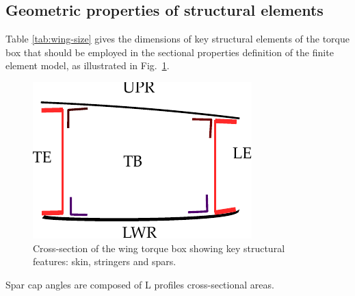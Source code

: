 \documentclass[11pt,a4paper,oneside]{memoir}
\begin{document}
\subsection{Geometric properties of structural elements}

Table \ref{tab:wing-size} gives the dimensions of key structural elements of the torque box that should be employed in the sectional properties definition of the finite element model, as illustrated in Fig.~\ref{fig:wing-cad-model-view}.

\begin{figure}
    \begin{center}
    \includegraphics[scale=1.0]{wing-cad-model-view.pdf}
    \caption{Cross-section of the wing torque box showing key structural features: skin, stringers and spars.}
    \label{fig:wing-cad-model-view}
    \end{center}
\end{figure}

Spar cap angles are composed of L profiles cross-sectional areas. 
\end{document}
